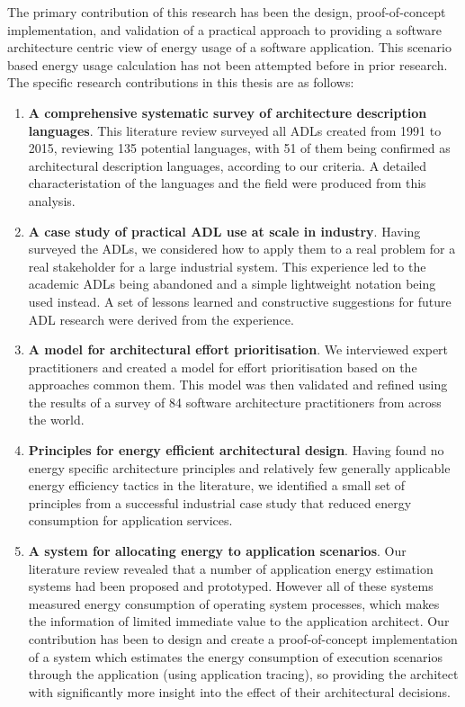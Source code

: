The primary contribution of this research has been the design, proof-of-concept implementation, and validation of a practical approach to providing a software architecture centric view of energy usage of a software application.  This scenario based energy usage calculation has not been attempted before in prior research.
\pagebreak
The specific research contributions in this thesis are as follows: \nopagebreak
\begin{enumerate}
	\item \textbf{A comprehensive systematic survey of architecture description languages}.  This literature review surveyed all ADLs created from 1991 to 2015, reviewing 135 potential languages, with 51 of them being confirmed as architectural description languages, according to our criteria.  A detailed characteristation of the languages and the field were produced from this analysis.
	\item \textbf{A case study of practical ADL use at scale in industry}.  Having surveyed the ADLs, we considered how to apply them to a real problem for a real stakeholder for a large industrial system.  This experience led to the academic ADLs being abandoned and a simple lightweight notation being used instead.  A set of lessons learned and constructive suggestions for future ADL research were derived from the experience.
	\item \textbf{A model for architectural effort prioritisation}.  We interviewed expert practitioners and created a model for effort prioritisation based on the approaches common them.  This model was then validated and refined using the results of a survey of 84 software architecture practitioners from across the world.
	\item \textbf{Principles for energy efficient architectural design}.  Having found no energy specific architecture principles and relatively few generally applicable energy efficiency tactics in the literature, we identified a small set of principles from a successful industrial case study that reduced energy consumption for application services.
	\item \textbf{A system for allocating energy to application scenarios}.  Our literature review revealed that a number of application energy estimation systems had been proposed and prototyped.  However all of these systems measured energy consumption of operating system processes, which makes the information of limited immediate value to the application architect.  Our contribution has been to design and create a proof-of-concept implementation of a system which estimates the energy consumption of execution scenarios through the application (using application tracing), so providing the architect with significantly more insight into the effect of their architectural decisions.
\end{enumerate}

